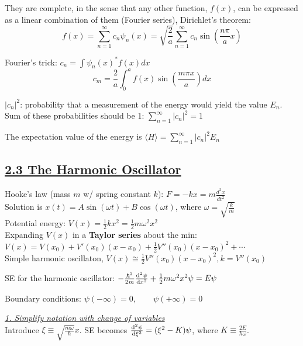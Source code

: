 
They are complete, in the sense that any other function, $f(x)$, can be expressed as a linear combination of them (Fourier series), Dirichlet's theorem:
    $$f(x) = \sum_{n=1}^{\infty} c_n \psi_n(x) = \sqrt{\frac{2}{a}} \sum_{n=1}^{\infty} c_n \sin(\frac{n \pi}{a} x)$$

Fourier's trick: $c_n = \int \psi_n(x)^* f(x) dx$
$$c_m = \frac{2}{a} \int_0^a f(x) \sin(\frac{m \pi x}{a}) dx$$

$|c_n|^2$: probability that a measurement of the energy would yield the value $E_n$. \\

Sum of these probabilities should be 1: $\sum_{n=1}^{\infty} |c_n|^2 = 1$

The expectation value of the energy is $\langle H \rangle = \sum_{n=1}^{\infty} |c_n|^2 E_n$

\subsection{\underline{2.3 The Harmonic Oscillator}}
Hooke's law (mass $m$ w/ spring constant $k$): $F = -kx = m \frac{d^2 x}{d t^2}$ \\
Solution is $x(t) = A \sin(\omega t) + B \cos(\omega t)$, where $\omega = \sqrt{\frac{k}{m}}$ \\
Potential energy: $V(x) = \frac{1}{2} k x^2 = \frac{1}{2} m \omega^2 x^2$ \\

Expanding $V(x)$ in a \textbf{Taylor series} about the min: $V(x) = V(x_0) + V'(x_0) (x - x_0) + \frac{1}{2} V''(x_0)(x- x_0)^2 + \cdots$ \\
Simple harmonic oscillaton, $V(x) \cong \frac{1}{2} V''(x_0) (x - x_0)^2, k = V''(x_0)$

SE for the harmonic oscillator: $-\frac{\hbar^2}{2m} \dv[2]{\psi}{x} + \frac{1}{2} m \omega^2 x^2 \psi = E \psi$

Boundary conditions: $\psi(-\infty) = 0, \qquad \psi(+\infty) = 0$

\smallskip

\textit{\underline{1. Simplify notation with change of variables}} \\
Introduce $\xi \equiv \sqrt{\frac{m \omega}{\hbar}} x$.
SE becomes $\dv[2]{\psi}{\xi} = (\xi^2 - K) \psi$, where $K \equiv \frac{2E}{\hbar \omega}$. \\

